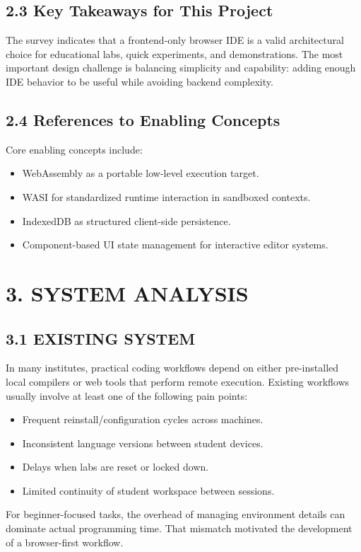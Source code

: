 \subsection*{2.3 Key Takeaways for This Project}
The survey indicates that a frontend-only browser IDE is a valid architectural choice for educational labs, quick experiments, and demonstrations. The most important design challenge is balancing simplicity and capability: adding enough IDE behavior to be useful while avoiding backend complexity.

\subsection*{2.4 References to Enabling Concepts}
Core enabling concepts include:
\begin{itemize}[leftmargin=8mm]
\item WebAssembly as a portable low-level execution target.
\item WASI for standardized runtime interaction in sandboxed contexts.
\item IndexedDB as structured client-side persistence.
\item Component-based UI state management for interactive editor systems.
\end{itemize}

\newpage
\section{3. SYSTEM ANALYSIS}

\subsection{3.1 EXISTING SYSTEM}
In many institutes, practical coding workflows depend on either pre-installed local compilers or web tools that perform remote execution. Existing workflows usually involve at least one of the following pain points:
\begin{itemize}[leftmargin=8mm]
\item Frequent reinstall/configuration cycles across machines.
\item Inconsistent language versions between student devices.
\item Delays when labs are reset or locked down.
\item Limited continuity of student workspace between sessions.
\end{itemize}

For beginner-focused tasks, the overhead of managing environment details can dominate actual programming time. That mismatch motivated the development of a browser-first workflow.

